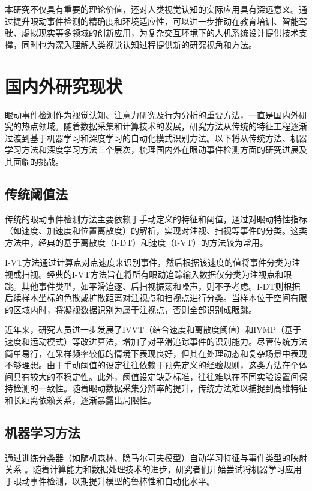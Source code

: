 \documentclass{xdupgthesis}
\begin{document}
本研究不仅具有重要的理论价值，还对人类视觉认知的实际应用具有深远意义。通过提升眼动事件检测的精确度和环境适应性，可以进一步推动在教育培训、智能驾驶、虚拟现实等多领域的创新应用，为复杂交互环境下的人机系统设计提供技术支撑，同时也为深入理解人类视觉认知过程提供新的研究视角和方法。

\section{国内外研究现状}

眼动事件检测作为视觉认知、注意力研究及行为分析的重要方法，一直是国内外研究的热点领域。随着数据采集和计算技术的发展，研究方法从传统的特征工程逐渐过渡到基于机器学习和深度学习的自动化模式识别方法。以下将从传统方法、机器学习方法和深度学习方法三个层次，梳理国内外在眼动事件检测方面的研究进展及其面临的挑战。

\subsection{传统阈值法}
传统的眼动事件检测方法主要依赖于手动定义的特征和阈值，通过对眼动特性指标（如速度、加速度和位置离散度）的解析，实现对注视、扫视等事件的分类。这类方法中，经典的基于离散度（I-DT）和速度（I-VT）的方法较为常用\cite{salvucci2000identifying}。

I-VT方法通过计算点对点速度来识别事件，然后根据该速度的值将事件分类为注视或扫视。经典的I-VT方法旨在将所有眼动追踪输入数据仅分类为注视点和眼跳。其他事件类型，如平滑追逐、后扫视振荡和噪声，则不予考虑。I-DT则根据后续样本坐标的色散或扩散距离对注视点和扫视点进行分类。当样本位于空间有限的区域内时，将凝视数据识别为属于注视点，否则全部识别成眼跳。

近年来，研究人员进一步发展了IVVT（结合速度和离散度阈值）和IVMP（基于速度和运动模式）等改进算法，增加了对平滑追踪事件的识别能力。尽管传统方法简单易行，在采样频率较低的情境下表现良好，但其在处理动态和复杂场景中表现不够理想。由于手动阈值的设定往往依赖于预先定义的经验规则，这类方法在个体间具有较大的不稳定性。此外，阈值设定缺乏标准，往往难以在不同实验设置间保持检测的一致性。随着眼动数据采集分辨率的提升，传统方法难以捕捉到高维特征和长距离依赖关系，逐渐暴露出局限性。

\subsection{机器学习方法}
通过训练分类器（如随机森林、隐马尔可夫模型）自动学习特征与事件类型的映射关系 \cite{zemblys2017eye,pekkanen2017new}。随着计算能力和数据处理技术的进步，研究者们开始尝试将机器学习应用于眼动事件检测，以期提升模型的鲁棒性和自动化水平。
\end{document}

